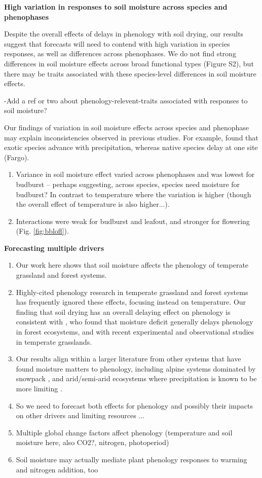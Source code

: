 \documentclass{article}
\begin{document}
\par \textbf {High variation in responses to soil moisture across species and phenophases}
\par Despite the overall effects of delays in phenology with soil drying, our results suggest that forecasts will need to contend with high variation in species responses, as well as differences across phenophases. We do not find strong differences in soil moisture effects across broad functional types (Figure S2), but there may be traits associated with these species-level differences in soil moisture effects.   
  \par -Add a ref or two about phenology-relevent-traits associated with responses to soil moisture?
\par Our findings of variation in soil moisture effects across species and phenophase may explain inconsistencies observed in previous studies. For example, \cite{wolkovich2012} found that exotic species advance with precipitation, whereas native species delay at one site (Fargo). 
\begin{enumerate}
\item Variance in soil moisture effect varied across phenophases and was lowest for budburst -- perhaps suggesting, across species, species need moisture for budburst? In contrast to temperature where the variation is higher (though the overall effect of temperature is also higher...). 
\item Interactions were weak for budburst and leafout, and stronger for flowering (Fig. \ref{fig:bblofl}).

\end{enumerate}
\textbf {Forecasting multiple drivers }
\begin{enumerate}
\item Our work here shows that soil moisture affects the phenology of temperate grassland and forest systems.
\item Highly-cited phenology research in temperate grassland and forest systems has frequently ignored these effects, focusing instead on temperature. Our finding that soil drying has an overall delaying effect on phenology is consistent with \citet{seyed2018}, who found that moisture deficit generally delays phenology in forest ecosystems, and with recent experimental \citep{liu2022} and observational \citep{tao2020} studies in temperate grasslands. 
\item Our results align within a larger literature from other systems that have found moisture matters to phenology, including alpine systems dominated by snowpack \citep[e.g.,][]{dunne2004,sherwood2017}, and arid/semi-arid ecosystems where precipitation is known to be more limiting \citep{tao2019}. 
\item So we need to forecast both effects for phenology and possibly their impacts on other drivers and limiting resources ... 
\item Multiple global change factors affect phenology (temperature and soil moisture here, also CO2?, nitrogen, photoperiod)
 \item Soil moisture may actually mediate plant phenology responses to warming and nitrogen addition, too \citep{liu2022}
 \end{enumerate}
\end{document}
